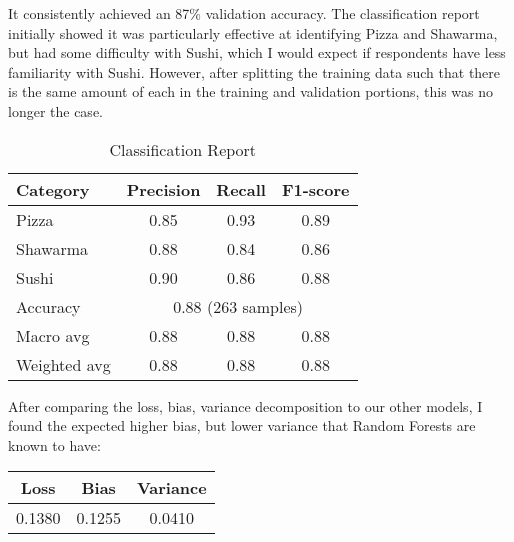It consistently achieved an 87\% validation accuracy. The classification report initially showed it was particularly effective at identifying Pizza and Shawarma, but had some difficulty with Sushi, which I would expect if respondents have less familiarity with Sushi. However, after splitting the training data such that there is the same amount of each in the training and validation portions, this was no longer the case.
\begin{table}[h]
    \centering
    \begin{tabular}{lccc}
        \hline
        Category & Precision & Recall & F1-score \\ 
        \hline
        Pizza    & 0.85 & 0.93 & 0.89 \\
        Shawarma & 0.88 & 0.84 & 0.86 \\
        Sushi    & 0.90 & 0.86 & 0.88 \\
        \hline
        Accuracy      & \multicolumn{3}{c}{0.88 (263 samples)} \\
        Macro avg     & 0.88 & 0.88 & 0.88 \\
        Weighted avg  & 0.88 & 0.88 & 0.88 \\
        \hline
    \end{tabular}
    \caption{Classification Report}
    \label{tab:classification_report}
\end{table}

After comparing the loss, bias, variance decomposition to our other models, I found the expected higher bias, but lower variance that Random Forests are known to have:
\begin{table}[h]
    \centering
    \begin{tabular}{ccc}
        \hline
        Loss & Bias & Variance \\ 
        \hline
        0.1380 & 0.1255 & 0.0410 \\
        \hline
    \end{tabular}
    \label{tab:loss_report}
\end{table}
